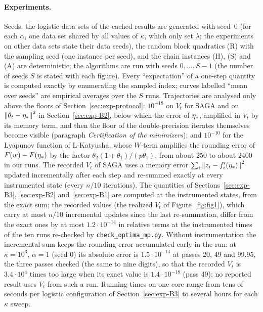 \paragraph{Experiments.}
Seeds: the logistic data sets of the cached results are generated with seed~$0$ (for each $\alpha$, one data set shared
by all values of $\kappa$, which only set $\lambda$; the experiments on other data sets state their data seeds), the
random block quadratics (R) with the sampling seed (one instance per seed), and the chain instances (H), (S) and (A) are
deterministic; the algorithms are run with seeds $0, \dots, S-1$ (the number of seeds $S$ is stated with each figure).
Every ``expectation'' of a one-step quantity is computed exactly by enumerating the sampled index; curves labelled
``mean over seeds'' are empirical averages over the $S$ runs. Trajectories are analysed only above the floors of
Section~\ref{sec:exp-protocol}: $10^{-18}$ on $V_t$ for SAGA and on $\left\|\theta_t-\eta_\ast\right\|^2$ in
Section~\ref{sec:exp-B2}, below which the error of $\eta_\ast$, amplified in $V_t$ by its memory term, and then the floor
of the double-precision iterates themselves become visible (paragraph \emph{Certification of the minimizers}); and
$10^{-10}$ for the Lyapunov function of L-Katyusha, whose $W$-term amplifies the rounding error of $F(w)-F(\eta_\ast)$ by
the factor $\theta_2(1+\theta_1)/(p\theta_1)$, from about $250$ to about $2400$ in our runs. The recorded $V_t$ of SAGA
uses a memory error $\sum_i\left\|z_i-f'_i(\eta_\ast)\right\|^2$ updated incrementally after each step and re-summed exactly at
every instrumented state (every $n/10$ iterations). The quantities of Sections~\ref{sec:exp-B3}, \ref{sec:exp-B2}
and~\ref{sec:exp-B1} are computed at the instrumented states, from the exact sum; the recorded values (the realized
$V_t$ of Figure~\ref{fig:fig1}), which carry at most $n/10$ incremental updates since the last re-summation, differ from
the exact ones by at most $1.2\cdot10^{-14}$ in relative terms at the instrumented times of the ten runs re-checked by
\nolinkurl{check_optima_mp.py}. Without instrumentation the incremental sum keeps the rounding error accumulated
early in the run: at $\kappa=10^3$, $\alpha=1$ (seed $0$) its absolute error is $1.5\cdot10^{-14}$ at passes 20, 49
and 99.95, the three passes checked (the same to nine digits), so that the recorded $V_t$ is $3.4\cdot10^4$ times too
large when its exact value is $1.4\cdot10^{-18}$ (pass 49); no reported result uses $V_t$ from such a run. Running times on one core range from tens of seconds per logistic configuration of
Section~\ref{sec:exp-B3} to several hours for each $\kappa$ sweep.

